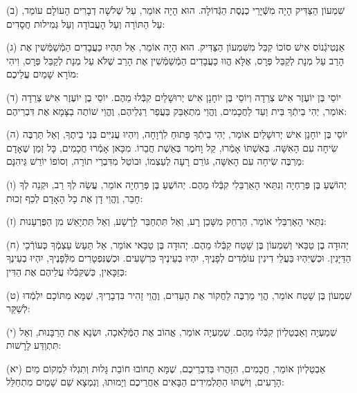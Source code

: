 \documentclass[twoside, openany, parskip=half, 11pt]{book}
\begin{document}
(ב) שִׁמְעוֹן הַצַּדִּיק הָיָה מִשְּֿׁיָרֵי כְנֶסֶת הַגְּֿדוֹלָה. הוּא הָיָה אוֹמֵר, עַל שְׁלשָׁה דְבָרִים הָעוֹלָם עוֹמֵד, עַל הַתּוֹרָה וְעַל הָעֲבוֹדָה וְעַל גְּמִילוּת חֲסָדִים:

(ג) אַנְטִיגְֿנוֹס אִישׁ סוֹכוֹ קִבֵּל מִשִּׁמְעוֹן הַצַּדִּיק. הוּא הָיָה אוֹמֵר, אַל תִּהְיוּ כַעֲבָדִים הַמְֿשַׁמְּֿשִׁין אֶת הָרַב עַל מְנָת לְקַבֵּל פְּרָס, אֶלָּא הֱווּ כַעֲבָדִים הַמְֿשַׁמְּֿשִׁין אֶת הָרַב שֶׁלֹּא עַל מְנָת לְקַבֵּל פְּרָס, וִיהִי מוֹרָא שָׁמַיִם עֲלֵיכֶם:

(ד) יוֹסֵי בֶּן יוֹעֶזֶר אִישׁ צְרֵדָה וְיוֹסֵי בֶּן יוֹחָנָן אִישׁ יְרוּשָׁלַיִם קִבְּֿלוּ מֵהֶם. יוֹסֵי בֶן יוֹעֶזֶר אִישׁ צְרֵדָה אוֹמֵר, יְהִי בֵיתְֿךָ בֵּית וַעַד לַחֲכָמִים, וֶהֱוֵי מִתְאַבֵּק בַּעֲפַר רַגְלֵיהֶם, וֶהֱוֵי שׁוֹתֶה בַצָּמָא אֶת דִּבְרֵיהֶם:

(ה) יוֹסֵי בֶּן יוֹחָנָן אִישׁ יְרוּשָׁלַיִם אוֹמֵר, יְהִי בֵיתְֿךָ פָּתוּחַ לִרְֿוָחָה, וְיִהְיוּ עֲנִיִּים בְּנֵי בֵיתֶךָ, וְאַל תַּרְבֶּה שִׂיחָה עִם הָאִשָּׁה. בְּאִשְׁתּוֹ אָמְֿרוּ, קַל וָחֹמֶר בְּאֵשֶׁת חֲבֵרוֹ. מִכָּאן אָמְֿרוּ חֲכָמִים, כָּל זְמַן שֶׁאָדָם מַרְבֶּה שִׂיחָה עִם הָאִשָּׁה, גּוֹרֵם רָעָה לְעַצְמוֹ, וּבוֹטֵל מִדִּבְרֵי תוֹרָה, וְסוֹפוֹ יוֹרֵשׁ גֵּיהִנָּם:

(ו) יְהוֹשֻׁעַ בֶּן פְּרַחְיָה וְנִתַּאי הָאַרְבֵּלִי קִבְּֿלוּ מֵהֶם. יְהוֹשֻׁעַ בֶּן פְּרַחְיָה אוֹמֵר, עֲשֵׂה לְךָ רַב, וּקְנֵה לְךָ חָבֵר, וֶהֱוֵי דָן אֶת כָל הָאָדָם לְכַף זְכוּת:

(ז) נִתַּאי הָאַרְבֵּלִי אוֹמֵר, הַרְחֵק מִשָּׁכֵן רָע, וְאַל תִּתְחַבֵּר לָרָשָׁע, וְאַל תִּתְיָאֵשׁ מִן הַפֻּרְעָנוּת:

(ח) יְהוּדָה בֶן טַבַּאי וְשִׁמְעוֹן בֶּן שָׁטַח קִבְּֿלוּ מֵהֶם. יְהוּדָה בֶּן טַבַּאי אוֹמֵר, אַל תַּעַשׂ עַצְמְֿךָ כְּעוֹרְֿכֵי הַדַּיָּנִין. וּכְשֶׁיִּהְיוּ בַּעֲלֵי דִינִין עוֹמְֿדִים לְפָנֶיךָ, יִהְיוּ בְעֵינֶיךָ כִּרְשָׁעִים. וּכְשֶׁנִּפְטָרִים מִלְּֿפָנֶיךָ, יִהְיוּ בְעֵינֶךָ כְּזַכָּאִין, כְּשֶׁקִּבְּֿלוּ עֲלֵיהֶם אֶת הַדִּין:

(ט) שִׁמְעוֹן בֶּן שָׁטַח אוֹמֵר, הֱוֵי מַרְבֶּה לַחֲקוֹר אֶת הָעֵדִים, וֶהֱוֵי זָהִיר בִּדְבָרֶיךָ, שֶׁמָּא מִתּוֹכָם יִלְמְֿדוּ לְשַׁקֵּר:



(י) שְׁמַעְיָה וְאַבְטַלְיוֹן קִבְּֿלוּ מֵהֶם. שְׁמַעְיָה אוֹמֵר, אֱהוֹב אֶת הַמְּֿלָאכָה, וּשְׂנָא אֶת הָרַבָּנוּת, וְאַל תִּתְוַדַּע לָרָשׁוּת:

(יא) אַבְטַלְיוֹן אוֹמֵר, חֲכָמִים, הִזָּהֲרוּ בְּדִבְרֵיכֶם, שֶׁמָּא תָחוֹבוּ חוֹבַת גָּלוּת וְתִגְלוּ לִמְקוֹם מַיִם הָרָעִים, וְיִשְׁתּוּ הַתַּלְמִידִים הַבָּאִים אַחֲרֵיכֶם וְיָמוּתוּ, וְנִמְצָא שֵׁם שָׁמַיִם מִתְחַלֵּל:
\end{document}
